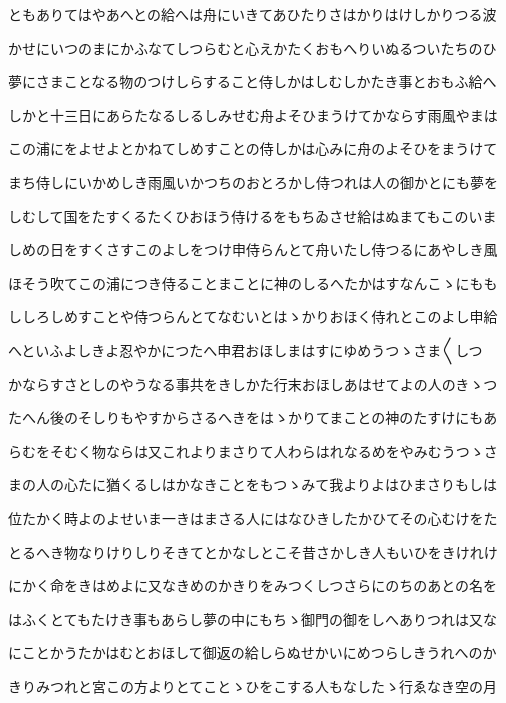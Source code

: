 \documentclass[a4paper,11pt,landscape]{ltjtarticle}
\begin{document}
\par\medskip
ともありてはやあへとの給へは舟にいきてあひたりさはかりはけしかりつる波
\par\medskip
かせにいつのまにかふなてしつらむと心えかたくおもへりいぬるついたちのひ
\par\medskip
夢にさまことなる物のつけしらすること侍しかはしむしかたき事とおもふ給へ
\par\medskip
しかと十三日にあらたなるしるしみせむ舟よそひまうけてかならす雨風やまは
\par\medskip
この浦にをよせよとかねてしめすことの侍しかは心みに舟のよそひをまうけて
\par\medskip
まち侍しにいかめしき雨風いかつちのおとろかし侍つれは人の御かとにも夢を
\par\medskip
しむして国をたすくるたくひおほう侍けるをもちゐさせ給はぬまてもこのいま
\par\medskip
しめの日をすくさすこのよしをつけ申侍らんとて舟いたし侍つるにあやしき風
\par\medskip
ほそう吹てこの浦につき侍ることまことに神のしるへたかはすなんこゝにもも
\par\medskip
ししろしめすことや侍つらんとてなむいとはゝかりおほく侍れとこのよし申給
\par\medskip
へといふよしきよ忍やかにつたへ申君おほしまはすにゆめうつゝさま〱しつ
\par\medskip
かならすさとしのやうなる事共をきしかた行末おほしあはせてよの人のきゝつ
\par\medskip
たへん後のそしりもやすからさるへきをはゝかりてまことの神のたすけにもあ
\par\medskip
らむをそむく物ならは又これよりまさりて人わらはれなるめをやみむうつゝさ
\par\medskip
まの人の心たに猶くるしはかなきことをもつゝみて我よりよはひまさりもしは
\par\medskip
位たかく時よのよせいま一きはまさる人にはなひきしたかひてその心むけをた
\par\medskip
とるへき物なりけりしりそきてとかなしとこそ昔さかしき人もいひをきけれけ
\par\medskip
にかく命をきはめよに又なきめのかきりをみつくしつさらにのちのあとの名を
\par\medskip
はふくとてもたけき事もあらし夢の中にもちゝ御門の御をしへありつれは又な
\par\medskip
にことかうたかはむとおほして御返の給しらぬせかいにめつらしきうれへのか
\par\medskip
きりみつれと宮この方よりとてことゝひをこする人もなしたゝ行ゑなき空の月
\end{document}
